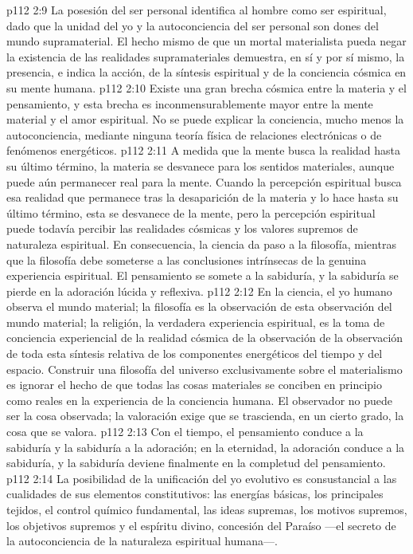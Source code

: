 \vs p112 2:9 La posesión del ser personal identifica al hombre como ser espiritual, dado que la unidad del yo y la autoconciencia del ser personal son dones del mundo supramaterial. El hecho mismo de que un mortal materialista pueda negar la existencia de las realidades supramateriales demuestra, en sí y por sí mismo, la presencia, e indica la acción, de la síntesis espiritual y de la conciencia cósmica en su mente humana.
\vs p112 2:10 Existe una gran brecha cósmica entre la materia y el pensamiento, y esta brecha es inconmensurablemente mayor entre la mente material y el amor espiritual. No se puede explicar la conciencia, mucho menos la autoconciencia, mediante ninguna teoría física de relaciones electrónicas o de fenómenos energéticos.
\vs p112 2:11 \pc A medida que la mente busca la realidad hasta su último término, la materia se desvanece para los sentidos materiales, aunque puede aún permanecer real para la mente. Cuando la percepción espiritual busca esa realidad que permanece tras la desaparición de la materia y lo hace hasta su último término, esta se desvanece de la mente, pero la percepción espiritual puede todavía percibir las realidades cósmicas y los valores supremos de naturaleza espiritual. En consecuencia, la ciencia da paso a la filosofía, mientras que la filosofía debe someterse a las conclusiones intrínsecas de la genuina experiencia espiritual. El pensamiento se somete a la sabiduría, y la sabiduría se pierde en la adoración lúcida y reflexiva.
\vs p112 2:12 En la ciencia, el yo humano observa el mundo material; la filosofía es la observación de esta observación del mundo material; la religión, la verdadera experiencia espiritual, es la toma de conciencia experiencial de la realidad cósmica de la observación de la observación de toda esta síntesis relativa de los componentes energéticos del tiempo y del espacio. Construir una filosofía del universo exclusivamente sobre el materialismo es ignorar el hecho de que todas las cosas materiales se conciben en principio como reales en la experiencia de la conciencia humana. El observador no puede ser la cosa observada; la valoración exige que se trascienda, en un cierto grado, la cosa que se valora.
\vs p112 2:13 Con el tiempo, el pensamiento conduce a la sabiduría y la sabiduría a la adoración; en la eternidad, la adoración conduce a la sabiduría, y la sabiduría deviene finalmente en la completud del pensamiento.
\vs p112 2:14 La posibilidad de la unificación del yo evolutivo es consustancial a las cualidades de sus elementos constitutivos: las energías básicas, los principales tejidos, el control químico fundamental, las ideas supremas, los motivos supremos, los objetivos supremos y el espíritu divino, concesión del Paraíso ---el secreto de la autoconciencia de la naturaleza espiritual humana---.

